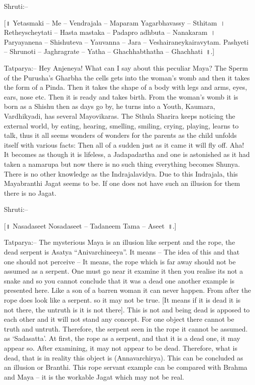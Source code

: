 Shruti:–

[॥ Yetasmaki – Me – Vendrajala – Maparam Yagarbhavassy – Sthitam~। Retheyscheytati – Hasta mastaka – Padapro adhbuta – Nanakaram~। Paryayanena – Shishuteva – Yauvanna – Jara – Veshairaneykairavytam. Pashyeti – Shrunoti – Jaghragrate – Yatha – Ghachhabthatha – Ghachhati~॥.]

Tatparya:– Hey Anjeneya! What can I say about this peculiar Maya? The Sperm of the Purusha's Gharbha the cells gets into the woman's womb and then it takes the form of a Pinda. Then it takes the shape of a body with legs and arms, eyes, ears, nose etc. Then it is ready and takes birth. From the woman's womb it is born as a Shishu then as days go by, he turns into a Youth, Kaumara, Vardhikyadi, has several Mayovikaras. The Sthula Sharira keeps noticing the external world, by eating, hearing, smelling, smiling, crying, playing, learns to talk, thus it all seems wonders of wonders for the parents as the child unfolds itself with various facts: Then all of a sudden just as it came it will fly off. Aha! It becomes as though it is lifeless, a Jadapadartha and one is astonished as it had taken a namarupa but now there is no such thing everything becomes Shunya. There is no other knowledge as the Indrajalavidya. Due to this Indrajala, this Mayabranthi Jagat seems to be. If one does not have such an illusion for them there is no Jagat.

Shruti:–

[॥ Nasadaseet Nosadaseet – Tadaneem Tama – Aseet~॥.]

Tatparya:– The mysterious Maya is an illusion like serpent and the rope, the dead serpent is Asatya “Anivarchineeya”. It means – The idea of this and that one should not perceive – It means, the rope which is far away should not be assumed as a serpent. One must go near it examine it then you realise its not a snake and so you cannot conclude that it was a dead one another example is presented here. Like a son of a barren woman it can never happen. From after the rope does look like a serpent. so it may not be true. [It means if it is dead it is not there, the untruth is it is not there]. This is not and being dead is apposed to each other and it will not stand any concept. For one object there cannot be truth and untruth. Therefore, the serpent seen in the rope it cannot be assumed. as ‘Sadasatta’. At first, the rope as a serpent, and that it is a dead one, it may appear so. After examining, it may not appear to be dead. Therefore, what is dead, that is in reality this object is (Annavarchirya). This can be concluded as an illusion or Branthi. This rope servant example can be compared with Brahma and Maya – it is the workable Jagat which may not be real.

